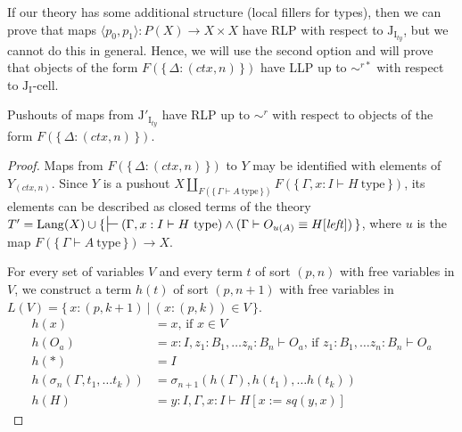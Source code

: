 \documentclass{mscs}
\newcommand{\deq}{\equiv}
\newcommand{\repl}{:=}
\newcommand{\Lang}{\mathrm{Lang}}
\newcommand{\leftI}{\mathit{left}}
\newcommand{\sq}{\mathit{sq}}
\newcommand{\emptyCtx}{*}
\newcommand{\type}{\mathrm{type}}
\newcommand{\I}{\mathrm{I}}
\newcommand{\J}{\mathrm{J}}
\newcommand{\class}[2]{#1\text{-}\mathrm{#2}}
\newcommand{\Icell}[1][\I]{\class{#1}{cell}}
\newcommand{\Jcell}[1][]{\Icell[\J#1]}
\numberwithin{figure}{section}
\begin{document}
If our theory has some additional structure (local fillers for types),
then we can prove that maps $\langle p_0, p_1 \rangle : P(X) \to X \times X$ have RLP with respect to $\J_{\I_{ty}}$, but we cannot do this in general.
Hence, we will use the second option and will prove that objects of the form $F(\{\,\Delta : (ctx,n)\,\})$ have LLP up to $\sim^{r*}$ with respect to $\Jcell[_\I]$.

\begin{lem}[Jty]
Pushouts of maps from $\J'_{\I_{ty}}$ have RLP up to $\sim^r$ with respect to objects of the form $F(\{\,\Delta : (ctx,n)\,\})$.
\end{lem}
\begin{proof}
Maps from $F(\{\,\Delta : (ctx,n)\,\})$ to $Y$ may be identified with elements of $Y_{(ctx,n)}$.
Since $Y$ is a pushout $X \amalg_{F(\{\,\Gamma \vdash A\ \type\,\})} F(\{\,\Gamma, x : I \vdash H\ \type\,\})$,
its elements can be described as closed terms of the theory
$T' = \Lang(X) \cup \{\,\sststile{}{} (\Gamma, x : I \vdash H\ \type) \land (\Gamma \vdash O_{u(A)} \deq H[\leftI])\,\}$,
where $u$ is the map $F(\{\,\Gamma \vdash A\ \type\,\}) \to X$.

For every set of variables $V$ and every term $t$ of sort $(p,n)$ with free variables in $V$,
we construct a term $h(t)$ of sort $(p,n+1)$ with free variables in $L(V) = \{\,x : (p,k+1)\ |\ (x : (p,k)) \in V\,\}$.
\begin{align*}
h(x) & = x \text{, if } x \in V \\
h(O_a) & = x : I, z_1 : B_1, \ldots z_n : B_n \vdash O_a \text{, if } z_1 : B_1, \ldots z_n : B_n \vdash O_a \\
h(\emptyCtx) & = I \\
h(\sigma_n(\Gamma, t_1, \ldots t_k)) & = \sigma_{n+1}(h(\Gamma), h(t_1), \ldots h(t_k)) \\
h(H) & = y : I, \Gamma, x : I \vdash H[x \repl \sq(y, x)]
\end{align*}


\end{proof}
\end{document}
